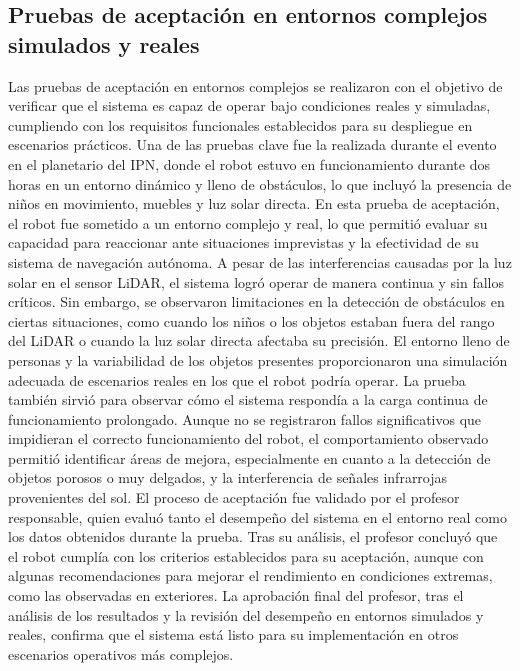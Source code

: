 \subsection{Pruebas de aceptaci\'on en entornos complejos simulados y reales}
    Las pruebas de aceptaci\'on en entornos complejos se realizaron con el objetivo de verificar 
        que el sistema es capaz de operar bajo condiciones reales y simuladas, cumpliendo con 
        los requisitos funcionales establecidos para su despliegue en escenarios pr\'acticos. Una 
        de las pruebas clave fue la realizada durante el evento en el planetario del IPN, donde el 
        robot estuvo en funcionamiento durante dos horas en un entorno din\'amico y lleno de obst\'aculos, 
        lo que incluy\'o la presencia de ni\~nos en movimiento, muebles y luz solar directa.
    \vskip 0.5cm
    En esta prueba de aceptaci\'on, el robot fue sometido a un entorno complejo y real, lo que permiti\'o evaluar 
        su capacidad para reaccionar ante situaciones imprevistas y la efectividad de su sistema de navegaci\'on 
        aut\'onoma. A pesar de las interferencias causadas por la luz solar en el sensor LiDAR, el sistema logr\'o 
        operar de manera continua y sin fallos cr\'iticos. Sin embargo, se observaron limitaciones en la detecci\'on 
        de obst\'aculos en ciertas situaciones, como cuando los ni\~nos o los objetos estaban fuera del rango del 
        LiDAR o cuando la luz solar directa afectaba su precisi\'on.
    \vskip 0.5cm
    El entorno lleno de personas y la variabilidad de los objetos presentes proporcionaron una simulaci\'on adecuada 
        de escenarios reales en los que el robot podr\'ia operar. La prueba tambi\'en sirvi\'o para observar c\'omo el 
        sistema respond\'ia a la carga continua de funcionamiento prolongado. Aunque no se registraron fallos 
        significativos que impidieran el correcto funcionamiento del robot, el comportamiento observado 
        permiti\'o identificar \'areas de mejora, especialmente en cuanto a la detecci\'on de objetos porosos o 
        muy delgados, y la interferencia de se\~nales infrarrojas provenientes del sol.
    \vskip 0.5cm
    El proceso de aceptaci\'on fue validado por el profesor responsable, quien evalu\'o tanto el desempe\~no 
        del sistema en el entorno real como los datos obtenidos durante la prueba. Tras su an\'alisis, 
        el profesor concluy\'o que el robot cumpl\'ia con los criterios establecidos para su aceptaci\'on, 
        aunque con algunas recomendaciones para mejorar el rendimiento en condiciones extremas, como 
        las observadas en exteriores.
    \vskip 0.5cm
    La aprobaci\'on final del profesor, tras el an\'alisis de los resultados y la revisi\'on del desempe\~no en entornos 
        simulados y reales, confirma que el sistema est\'a listo para su implementaci\'on en otros escenarios 
        operativos m\'as complejos.
